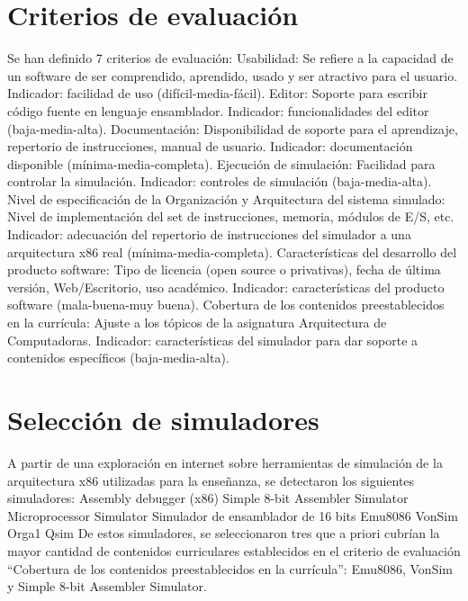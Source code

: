 \documentclass[12pt,twoside]{templates/unerthesis}
\begin{document}
\hypertarget{criterios-de-evaluaciuxf3n}{%
\section{Criterios de evaluación}\label{criterios-de-evaluaciuxf3n}}

Se han definido 7 criterios de evaluación:
Usabilidad: Se refiere a la capacidad de un software de ser comprendido, aprendido, usado y ser atractivo para el usuario. Indicador: facilidad de uso (difícil-media-fácil).
Editor: Soporte para escribir código fuente en lenguaje ensamblador. Indicador: funcionalidades del editor (baja-media-alta).
Documentación: Disponibilidad de soporte para el aprendizaje, repertorio de instrucciones, manual de usuario. Indicador: documentación disponible (mínima-media-completa).
Ejecución de simulación: Facilidad para controlar la simulación. Indicador: controles de simulación (baja-media-alta).
Nivel de especificación de la Organización y Arquitectura del sistema simulado: Nivel de implementación del set de instrucciones, memoria, módulos de E/S, etc. Indicador: adecuación del repertorio de instrucciones del simulador a una arquitectura x86 real (mínima-media-completa).
Características del desarrollo del producto software: Tipo de licencia (open source o privativas), fecha de última versión, Web/Escritorio, uso académico. Indicador: características del producto software (mala-buena-muy buena).
Cobertura de los contenidos preestablecidos en la currícula: Ajuste a los tópicos de la asignatura Arquitectura de Computadoras. Indicador: características del simulador para dar soporte a contenidos específicos (baja-media-alta).

\hypertarget{selecciuxf3n-de-simuladores}{%
\section{Selección de simuladores}\label{selecciuxf3n-de-simuladores}}

A partir de una exploración en internet sobre herramientas de simulación de la arquitectura x86 utilizadas para la enseñanza, se detectaron los siguientes simuladores:
Assembly debugger (x86)
Simple 8-bit Assembler Simulator
Microprocessor Simulator
Simulador de ensamblador de 16 bits
Emu8086
VonSim
Orga1
Qsim
De estos simuladores, se seleccionaron tres que a priori cubrían la mayor cantidad de contenidos curriculares establecidos en el criterio de evaluación ``Cobertura de los contenidos preestablecidos en la currícula'': Emu8086, VonSim y Simple 8-bit Assembler Simulator.
\end{document}
